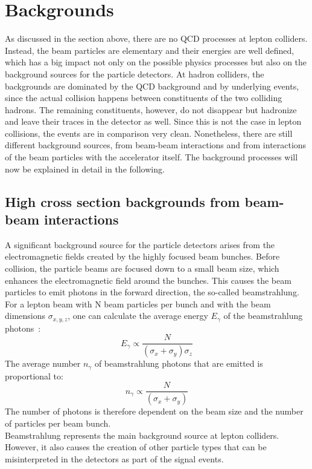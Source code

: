 \section{Backgrounds}
\label{Backgrounds}
As discussed in the section above, there are no QCD processes at lepton colliders.
Instead, the beam particles are elementary and their energies are well defined, which has a big impact not only on the possible physics processes but also on the background sources for the particle detectors.
At hadron colliders, the backgrounds are dominated by the QCD background and by underlying events, since the actual collision happens between constituents of the two colliding hadrons.
The remaining constituents, however, do not disappear but hadronize and leave their traces in the detector as well.
Since this is not the case in lepton collisions, the events are in comparison very clean.
Nonetheless, there are still different background sources, from beam-beam interactions and from interactions of the beam particles with the accelerator itself.
The background processes will now be explained in detail in the following.

\subsection{High cross section backgrounds from beam-beam interactions}
\label{BeamBeam}
A significant background source for the particle detectors arises from the electromagnetic fields created by the highly focused beam bunches.
Before collision, the particle beams are focused down to a small beam size, which enhances the electromagnetic field around the bunches.
This causes the beam particles to emit photons in the forward direction, the so-called beamstrahlung.
\\For a lepton beam with N beam particles per bunch and with the beam dimensions $\sigma_{x,y,z}$, one can calculate the average energy $E_{\gamma}$ of the beamstrahlung photons~\cite{Beamstrahlung_CLIC}: 
\begin{equation}
 E_{\gamma} \propto \frac{N}{(\sigma_x+\sigma_y)\sigma_z}
 \label{eq:pair_energy}
\end{equation}
The average number $n_{\gamma}$ of beamstrahlung photons that are emitted is proportional to:
\begin{equation}
 n_{\gamma} \propto \frac{N}{(\sigma_x+\sigma_y)}
 \label{eq:pair_number}
\end{equation}
The number of photons is therefore dependent on the beam size and the number of particles per beam bunch.
\\Beamstrahlung represents the main background source at lepton colliders.
However, it also causes the creation of other particle types that can be misinterpreted in the detectors as part of the signal events.


